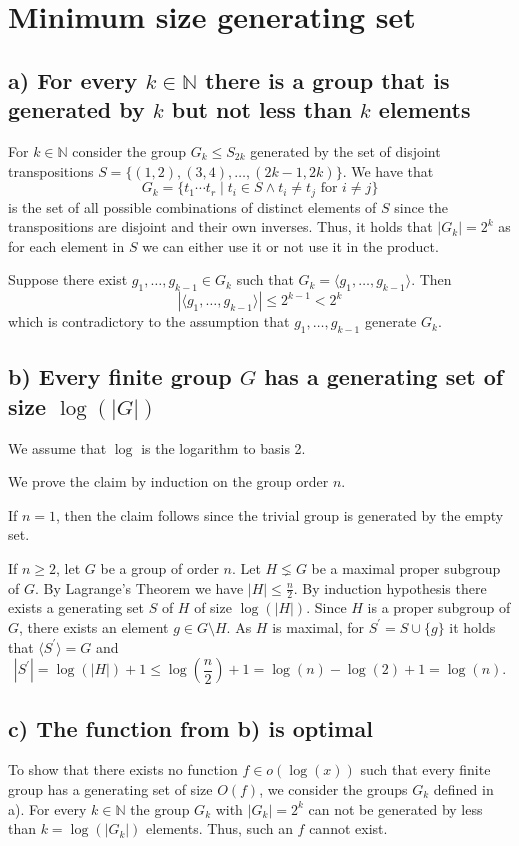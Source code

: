 \section{Minimum size generating set}

\subsection*{a) For every $k \in \mathds{N}$ there is a group that is generated by $k$ but not less than $k$ elements}

For $k \in \mathds{N}$ consider the group $G_k \leq S_{2k}$ generated by the set of disjoint transpositions $S = \{ (1,2), (3,4), \dots, (2k-1,2k) \}$. We have that
\[ G_k = \{ t_1 \cdots t_r \mid t_i \in S \wedge t_i \neq t_j \text{ for } i \neq j \} \]
is the set of all possible combinations of distinct elements of $S$ since the transpositions are disjoint and their own inverses. Thus, it holds that $|G_k| = 2^k$ as for each element in $S$ we can either use it or not use it in the product.

Suppose there exist $g_1, \dots, g_{k-1} \in G_k$ such that $G_k = \langle g_1, \dots, g_{k-1} \rangle$. Then
\[ |\langle g_1, \dots, g_{k-1} \rangle| \leq 2^{k-1} < 2^k \]
which is contradictory to the assumption that $g_1, \dots, g_{k-1}$ generate $G_k$.


\subsection*{b) Every finite group $G$ has a generating set of size $\log(|G|)$}

We assume that $\log$ is the logarithm to basis 2.

We prove the claim by induction on the group order $n$. 

If $n = 1$, then the claim follows since the trivial group is generated by the empty set.

If $n \geq 2$, let $G$ be a group of order $n$. Let $H \lneq G$ be a maximal proper subgroup of $G$. By Lagrange's Theorem we have $|H| \leq \frac{n}{2}$. By induction hypothesis there exists a generating set $S$ of $H$ of size $\log(|H|)$. Since $H$ is a proper subgroup of $G$, there exists an element $g \in G \setminus H$. As $H$ is maximal, for $S^\prime = S \cup \{g\}$ it holds that $\langle S^\prime \rangle = G$ and
\[ |S^\prime| = \log(|H|)+1 \leq \log(\frac{n}{2})+1 = \log(n)-\log(2)+1 = \log(n).\]


\subsection*{c) The function from b) is optimal}

To show that there exists no function $f \in o(\log(x))$ such that every finite group has a generating set of size $O(f)$, we consider the groups $G_k$ defined in a). For every $k \in \mathds{N}$ the group $G_k$ with $|G_k| = 2^k$ can not be generated by less than $k = \log(|G_k|)$ elements. Thus, such an $f$ cannot exist.